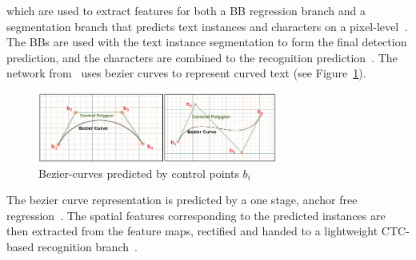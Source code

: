 which are used to extract features for both a \ac{BB} regression branch and a segmentation branch
that predicts text instances and characters on a pixel-level~\citep{lyu_mask_2018}.
The \acp{BB} are used with the text instance segmentation to form the final detection prediction, and
the characters are combined to the recognition prediction~\citep{lyu_mask_2018}.
The network from~\cite{liu_abcnet_2020} uses bezier curves to represent curved text (see
Figure~\ref{fig:bezier}).
\begin{figure}[hb]
    \centering
    \includegraphics[width=0.7\textwidth]{img/E2E-2-stage-bezier-Liu-ABCNet-2020.png}
    \caption[Bezier-curves predicted by control points]{%
        Bezier-curves predicted by control points $b_i$~\citep{liu_abcnet_2020}\label{fig:bezier}
    }
\end{figure}
The bezier curve representation is predicted by a one stage, anchor free
regression~\citep{liu_abcnet_2020}.
The spatial features corresponding to the predicted instances are then extracted from the feature
maps, rectified and handed to a lightweight \ac{CTC}-based recognition branch~\citep{lyu_mask_2018}.
